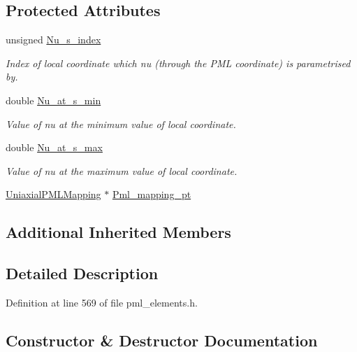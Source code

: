 \subsection*{Protected Attributes}
\begin{DoxyCompactItemize}
\item 
unsigned \hyperlink{classoomph_1_1Conformal2DPMLElement_a8c2bbfc42eb94014640a9945b698e107}{Nu\+\_\+s\+\_\+index}
\begin{DoxyCompactList}\small\item\em Index of local coordinate which nu (through the P\+ML coordinate) is parametrised by. \end{DoxyCompactList}\item 
double \hyperlink{classoomph_1_1Conformal2DPMLElement_ad8d7cc7a1c6e6daf1e70f33e86ba6e89}{Nu\+\_\+at\+\_\+s\+\_\+min}
\begin{DoxyCompactList}\small\item\em Value of nu at the minimum value of local coordinate. \end{DoxyCompactList}\item 
double \hyperlink{classoomph_1_1Conformal2DPMLElement_a465f23e8087bb37ff3f61f25c2722735}{Nu\+\_\+at\+\_\+s\+\_\+max}
\begin{DoxyCompactList}\small\item\em Value of nu at the maximum value of local coordinate. \end{DoxyCompactList}\item 
\hyperlink{classoomph_1_1UniaxialPMLMapping}{Uniaxial\+P\+M\+L\+Mapping} $\ast$ \hyperlink{classoomph_1_1Conformal2DPMLElement_a8e9046efb4999dbb5840917a9568aad4}{Pml\+\_\+mapping\+\_\+pt}
\end{DoxyCompactItemize}
\subsection*{Additional Inherited Members}


\subsection{Detailed Description}


Definition at line 569 of file pml\+\_\+elements.\+h.



\subsection{Constructor \& Destructor Documentation}
\mbox{\label{classoomph_1_1Conformal2DPMLElement_a6279ae664761a04681287176cc0ae9d4}} 
